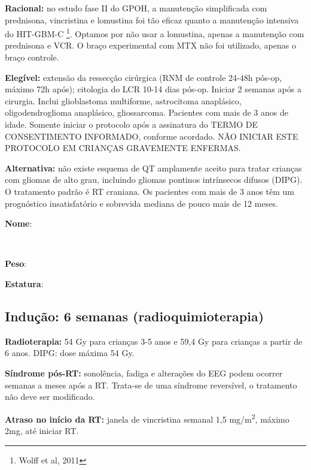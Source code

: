 \documentclass[11pt,a4paper,oldfontcommands]{memoir}
\def\entrywithlabel[#1]#2{\parbox{#1}{{\small #2:} \hrulefill}}
\begin{document}
\textbf{Racional:} no estudo fase II do GPOH, a manutenção simplificada com prednisona, vincristina e lomustina foi tão eficaz quanto a manutenção intensiva do HIT-GBM-C \footnote{Wolff et al, 2011}. Optamos por não usar a lomustina, apenas a manutenção com prednisona e VCR. O braço experimental com MTX não foi utilizado, apenas o braço controle.

\textbf{Elegível:} extensão da ressecção cirúrgica (RNM de controle 24-48h pós-op, máximo 72h após); citologia do LCR 10-14 dias pós-op. Iniciar 2 semanas após a cirurgia. Inclui glioblastoma multiforme, astrocitoma anaplásico, oligodendroglioma anaplásico, gliossarcoma. Pacientes com mais de 3 anos de idade. Somente iniciar o protocolo após a assinatura do TERMO DE CONSENTIMENTO INFORMADO, conforme acordado. NÃO INICIAR ESTE PROTOCOLO EM CRIANÇAS GRAVEMENTE ENFERMAS.

\textbf{Alternativa:} não existe esquema de QT amplamente aceito para tratar crianças com gliomas de alto grau, incluindo gliomas pontinos intrínsecos difusos (DIPG). O tratamento padrão é RT craniana. Os pacientes com mais de 3 anos têm um prognóstico insatisfatório e sobrevida mediana de pouco mais de 12 meses.
\\[0.4cm]
\entrywithlabel[1\hsize]{\textbf{Nome}}\hfill
\\[0.3cm]
\entrywithlabel[.45\hsize]{\textbf{Peso}}\hfill  \entrywithlabel[.45\hsize]{\textbf{Estatura}}

\subsection{Indução: 6 semanas (radioquimioterapia)}
\textbf{Radioterapia:} 54 Gy para crianças 3-5 anos e 59,4 Gy para crianças a partir de 6 anos. DIPG: dose máxima 54 Gy.

\textbf{Síndrome pós-RT:} sonolência, fadiga e alterações do EEG podem ocorrer semanas a meses após a RT. Trata-se de uma síndrome reversível, o tratamento não deve ser modificado.

\textbf{Atraso no início da RT:} janela de vincristina semanal 1,5 mg/m\textsuperscript{2}, máximo 2mg, até iniciar RT.

\renewcommand{\arraystretch}{1.5}
\end{document}
